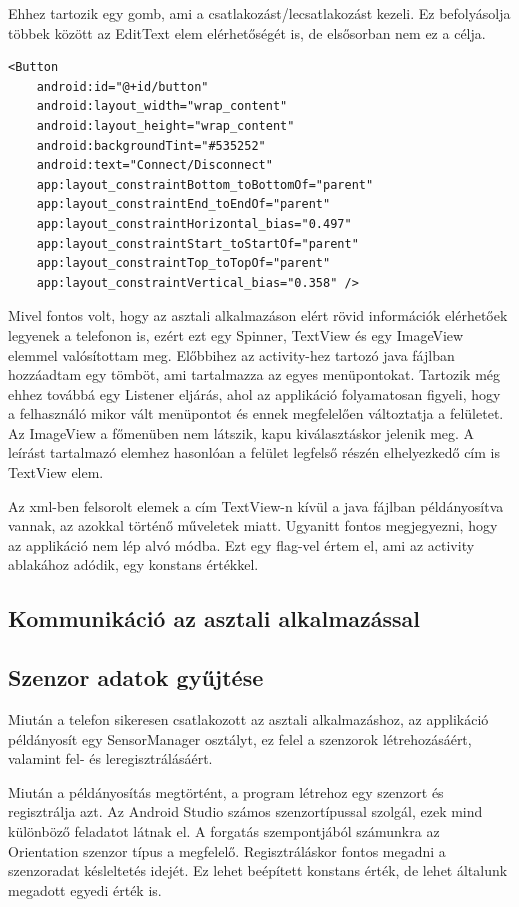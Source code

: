 \documentclass[
]{thesis-ekf}
\theoremstyle{definition}
\theoremstyle{remark}
\begin{document}
Ehhez tartozik egy gomb, ami a csatlakozást/lecsatlakozást kezeli. Ez befolyásolja többek között az EditText elem elérhetőségét is, de elsősorban nem ez a célja.

\begin{lstlisting}[caption={Button létrehozása xml-ben}]
<Button
	android:id="@+id/button"
	android:layout_width="wrap_content"
	android:layout_height="wrap_content"
	android:backgroundTint="#535252"
	android:text="Connect/Disconnect"
	app:layout_constraintBottom_toBottomOf="parent"
	app:layout_constraintEnd_toEndOf="parent"
	app:layout_constraintHorizontal_bias="0.497"
	app:layout_constraintStart_toStartOf="parent"
	app:layout_constraintTop_toTopOf="parent"
	app:layout_constraintVertical_bias="0.358" />
\end{lstlisting}

Mivel fontos volt, hogy az asztali alkalmazáson elért rövid információk elérhetőek legyenek a telefonon is, ezért ezt egy Spinner, TextView és egy ImageView elemmel valósítottam meg. Előbbihez az activity-hez tartozó java fájlban hozzáadtam egy tömböt, ami tartalmazza az egyes menüpontokat. Tartozik még ehhez továbbá egy Listener eljárás, ahol az applikáció folyamatosan figyeli, hogy a felhasználó mikor vált menüpontot és ennek megfelelően változtatja a felületet. Az ImageView a főmenüben nem látszik, kapu kiválasztáskor jelenik meg. A leírást tartalmazó elemhez hasonlóan a felület legfelső részén elhelyezkedő cím is TextView elem.


Az xml-ben felsorolt elemek a cím TextView-n kívül a java fájlban példányosítva vannak, az azokkal történő műveletek miatt. Ugyanitt fontos megjegyezni, hogy az applikáció nem lép alvó módba. Ezt egy flag-vel értem el, ami az activity ablakához adódik, egy konstans értékkel.

\subsection{Kommunikáció az asztali alkalmazással}

\subsection{Szenzor adatok gyűjtése}
Miután a telefon sikeresen csatlakozott az asztali alkalmazáshoz, az applikáció példányosít egy SensorManager osztályt, ez felel a szenzorok létrehozásáért, valamint fel- és leregisztrálásáért.

Miután a példányosítás megtörtént, a program létrehoz egy szenzort és regisztrálja azt. Az Android Studio számos szenzortípussal szolgál, ezek mind különböző feladatot látnak el. A forgatás szempontjából számunkra az Orientation szenzor típus a megfelelő. Regisztráláskor fontos megadni a szenzoradat késleltetés idejét. Ez lehet beépített konstans érték, de lehet általunk megadott egyedi érték is. 
\end{document}
